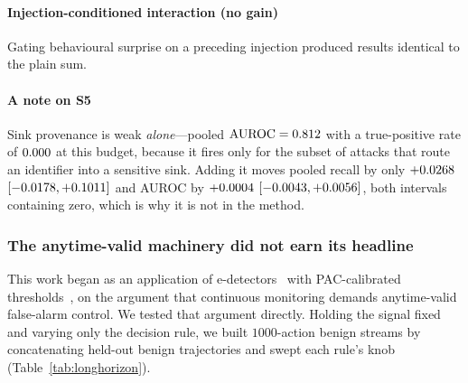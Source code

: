 \documentclass[preprint,12pt,number]{elsarticle}
\theoremstyle{definition}
\begin{document}
\paragraph{Injection-conditioned interaction (no gain)} Gating behavioural
surprise on a preceding injection produced results identical to the plain sum.

\paragraph{A note on S5} Sink provenance is weak \emph{alone}---pooled
$\mathrm{AUROC} = 0.812$ with a true-positive rate of $0.000$ at
this budget,
because it fires only for the subset of attacks that route an identifier into a
sensitive sink. Adding it moves pooled recall by only $+0.0268$
$[-0.0178, +0.1011]$ and AUROC by $+0.0004$
$[-0.0043, +0.0056]$, both intervals containing zero, which is
why it is not in the method.

\subsubsection{The anytime-valid machinery did not earn its headline}
\label{sec:longhorizon}

This work began as an application of e-detectors~\citep{shin2023edetectors} with
PAC-calibrated thresholds~\citep{sadhuka2025evaluator}, on the argument that
continuous monitoring demands anytime-valid false-alarm control. We tested that
argument directly. Holding the signal fixed and varying only the decision rule, we
built $1000$-action benign streams by concatenating held-out benign trajectories
and swept each rule's knob (Table~\ref{tab:longhorizon}).
\end{document}
